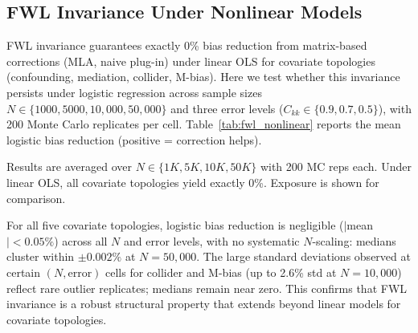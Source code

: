 \subsection{FWL Invariance Under Nonlinear Models}
\label{sec:fwl_nonlinear}

FWL invariance guarantees exactly 0\% bias reduction from matrix-based corrections (MLA, naive plug-in) under linear OLS for covariate topologies (confounding, mediation, collider, M-bias). Here we test whether this invariance persists under logistic regression across sample sizes $N \in \{1000, 5000, 10{,}000, 50{,}000\}$ and three error levels ($C_{kk} \in \{0.9, 0.7, 0.5\}$), with 200 Monte Carlo replicates per cell. Table~\ref{tab:fwl_nonlinear} reports the mean logistic bias reduction (positive = correction helps).

Results are averaged over $N \in \{1K, 5K, 10K, 50K\}$ with 200 MC reps each. Under linear OLS, all covariate topologies yield exactly 0\%. Exposure is shown for comparison.

\begin{table}[H]
\centering
\small
\caption{Mean logistic bias reduction (\%) from matrix-based correction.}
\label{tab:fwl_nonlinear}
\end{table}

For all five covariate topologies, logistic bias reduction is negligible ($|$mean$| < 0.05\%$) across all $N$ and error levels, with no systematic $N$-scaling: medians cluster within $\pm 0.002\%$ at $N{=}50{,}000$. The large standard deviations observed at certain $(N, \text{error})$ cells for collider and M-bias (up to 2.6\% std at $N{=}10{,}000$) reflect rare outlier replicates; medians remain near zero. This confirms that FWL invariance is a robust structural property that extends beyond linear models for covariate topologies.

